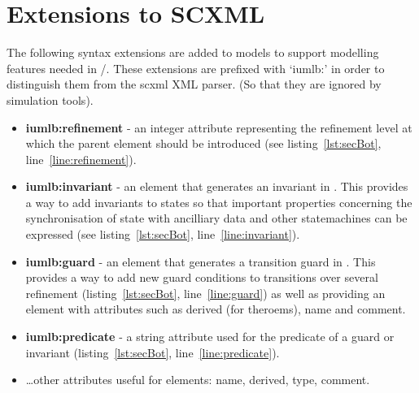 
\section{Extensions to SCXML}
\label{sec:extensions}
 
The following syntax extensions are added to \SCXML models to support modelling features needed in \iUMLB/\EventB. These extensions are prefixed with `iumlb:' in order to distinguish them from the scxml XML parser. (So that they are ignored by \SCXML simulation tools). 
\begin{itemize}
	\item \textbf{iumlb:refinement} - an integer attribute representing the refinement level at which the parent element should be introduced (see listing~\ref{lst:secBot}, line~\ref{line:refinement}).
	\item \textbf{iumlb:invariant} - an element that generates an invariant in \iUMLB. This provides a way to add invariants to states so that important properties concerning the synchronisation of state with ancilliary data and other statemachines can be expressed (see listing~\ref{lst:secBot}, line~\ref{line:invariant}).
	\item \textbf{iumlb:guard} - an element that generates a transition guard in \iUMLB. 
	This provides a way to add new guard conditions to transitions over several refinement (listing~\ref{lst:secBot}, line~\ref{line:guard}) as well as providing an element with attributes such as derived (for \EventB theroems), name and comment.
	\item \textbf{iumlb:predicate} - a string attribute used for the predicate of a guard or invariant (listing~\ref{lst:secBot}, line~\ref{line:predicate}).
	\item \ldots other attributes useful for \iUMLB elements: name, derived, type, comment.
\end{itemize}

